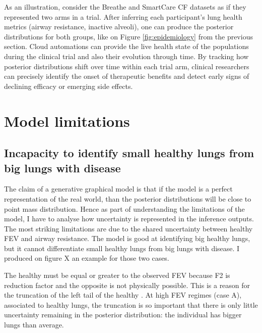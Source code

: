 As an illustration, consider the Breathe and SmartCare CF datasets as if they represented two arms in a trial. After inferring each participant's lung health metrics (airway resistance, inactive alveoli), one can produce the posterior distributions for both groups, like on Figure \ref{fig:epidemiology} from the previous section. Cloud automations can provide the live health state of the populations during the clinical trial and also their evolution through time. By tracking how posterior distributions shift over time within each trial arm, clinical researchers can precisely identify the onset of therapeutic benefits and detect early signs of declining efficacy or emerging side effects.


\section{Model limitations}

\subsection{Incapacity to identify small healthy lungs from big lungs with disease}
The claim of a generative graphical model is that if the model is a perfect representation of the real world, than the posterior distributions will be close to point mass distribution. Hence as part of understanding the limitations of the model, I have to analyse how uncertainty is represented in the inference outputs. The most striking limitations are due to the shared uncertainty between healthy FEV and airway resistance. The model is good at identifying big healthy lungs, but it cannot differentiate small healthy lungs from big lungs with disease. I produced on figure X an example for those two cases.

The healthy \F must be equal or greater to the observed FEV because F2 is reduction factor and the opposite is not physically possible. This is a reason for the truncation of the left tail of the healthy \F. At high FEV regimes (case A), associated to healthy lungs, the truncation is so important that there is only little uncertainty remaining in the posterior distribution: the individual has bigger lungs than average.

